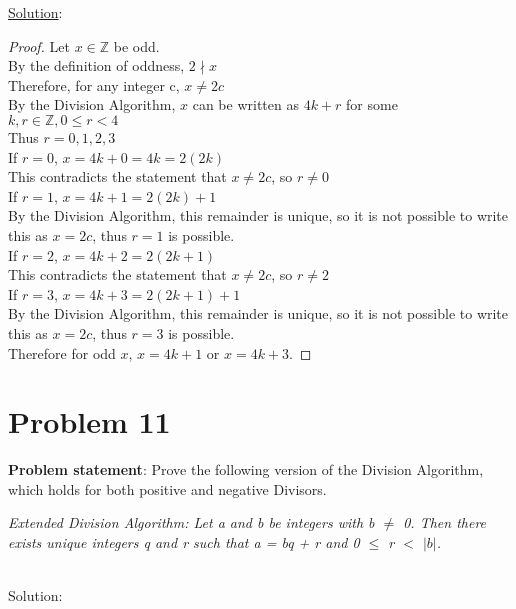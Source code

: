 \documentclass{article} %
\begin{document}
\underline{Solution}: 
\begin{addmargin}[1em]{0em}
\begin{proof} \hfill \break
Let $x \in \mathbb{Z}$ be odd.
\\By the definition of oddness, $2 \nmid x$
\\Therefore, for any integer c, $x \neq 2c$
\\By the Division Algorithm, $x$ can be written as $4k + r$ for some $k, r \in \mathbb{Z}, 0 \leq r < 4 $
\\Thus $r = 0,1,2,3$
\\If $r = 0$, $x = 4k + 0 = 4k = 2(2k)$
\\This contradicts the statement that $x \neq 2c$, so $ r \neq 0$
\\If $r = 1$, $x = 4k + 1 = 2(2k) + 1$
\\By the Division Algorithm, this remainder is unique, so it is not possible to write this as $x = 2c$, thus $r = 1$ is possible.
\\If $r = 2$, $x = 4k + 2 = 2(2k + 1)$
\\This contradicts the statement that $x \neq 2c$, so $ r \neq 2$
\\If $r = 3$, $x = 4k + 3 = 2(2k + 1) + 1$
\\By the Division Algorithm, this remainder is unique, so it is not possible to write this as $x = 2c$, thus $r = 3$ is possible.
\\Therefore for odd $x$, $x = 4k + 1$ or $x = 4k + 3$.
\end{proof}
\end{addmargin}

\newpage
\section*{Problem 11}

\textbf{Problem statement}:
Prove the following version of the Division Algorithm, which holds for both positive and negative Divisors.
\\ \begin{addmargin}[1em]{0em}
\textit{Extended Division Algorithm: Let a and b be integers with b $\neq$ 0.  Then there exists unique integers q and r such that a = bq + r and 0 $\leq$ r $<$ $|b|$.}
\end{addmargin} \hfill {}
\\


Solution: 
\begin{addmargin}[1em]{0em}

\end{addmargin}

\end{document}
